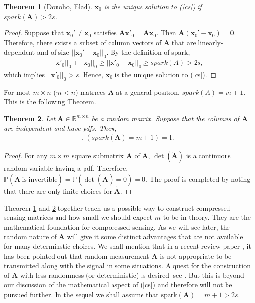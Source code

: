 \documentclass[11pt]{article}
\numberwithin{equation}{section}
\theoremstyle{plain}
\newtheorem{Th}{Theorem}[section]
\theoremstyle{definition}
\def\R{{\mathbb R}}
\def\R{{\mathbb R}}
\def\P{{\mathbb P}}
\def\A{{\mathbf A}}
\def\x{{\mathbf x}}
\begin{document}
\begin{Th}[Donoho, Elad]\label{spark}
$\x_0$ is the unique solution to (\ref{cs}) if $spark(\A)>2s$. 
\end{Th}
\begin{proof}
Suppose that $\x_0'\neq\x_0$ satisfies $\A\x'_0=\A\x_0$. Then $\A(\x_0'-\x_0)=\mathbf{0}$. Therefore, there exists a subset of column vectors of $\A$ that are linearly-dependent and of size $||\x_0'-\x_0||_0$. By the definition of spark, 
\begin{align*}
||\x'_0||_0+||\x_0||_0\geq ||\x'_0-\x_0||_0\geq spark(A)>2s, 
\end{align*}
which implies $||\x'_0||_0>s$. Hence, $\x_0$ is the unique solution to (\ref{cs}).   
\end{proof}
For most $m\times n$ ($m<n$) matrices $\A$ at a general position, $spark(A)=m+1$. This is the following Theorem. 
\begin{Th}\label{random mesurement}
Let $\A\in\R^{m\times n}$ be a random matrix. Suppose that the columns of $\A$ are independent and have pdfs. Then, 
\begin{align*}
\P\left(spark(\A)=m+1\right)=1. 
\end{align*}
\end{Th} 
\begin{proof}
For any $m\times m$ square submatrix $\tilde{\A}$ of $\A$, $\det(\tilde{\A})$ is a continuous random variable having a pdf. Therefore, $\P(\tilde{\A}\ \text{is\ invertible})=\P(\det(\tilde{\A})=0)=0$. The proof is completed by noting that there are only finite choices for $\tilde{\A}$. 
\end{proof}

Theorem \ref{spark} and \ref{random mesurement} together teach us a possible way to construct compressed sensing matrices and how small we should expect $m$ to be in theory. They are the mathematical foundation for comporessed sensing. As we will see later, the random nature of $\A$ will give it some distinct advantages that are not available for many determinstic choices. We shall mention that in a recent review paper \cite{rani2018systematic}, it has been pointed out that random measurement $\A$ is not appropriate to be transmitted  along with the signal in some situations. A quest for the construction of $\A$ with less randomness (or deterministic) is desired, see \cite{kasiviswanathan2019restricted}. But this is beyond our discussion of the mathematical aspect of (\ref{cs}) and therefore will not be pursued further. In the sequel we shall assume that $\text{spark}(\A)=m+1>2s$. 
 
\end{document}
